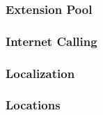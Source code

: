 \documentclass[letterpaper,10pt,english]{sphinxmanual}
\begin{document}
\subsubsection{Extension Pool}
\label{\detokenize{webui:extension-pool}}\label{\detokenize{webui:id52}}\begin{quote}

\end{quote}


\subsubsection{Internet Calling}
\label{\detokenize{webui:internet-calling}}\label{\detokenize{webui:id53}}\begin{quote}

\end{quote}


\subsubsection{Localization}
\label{\detokenize{webui:localization}}\label{\detokenize{webui:id54}}\begin{quote}

\end{quote}


\subsubsection{Locations}
\label{\detokenize{webui:locations}}\label{\detokenize{webui:id55}}\begin{quote}

\end{quote}
\end{document}

